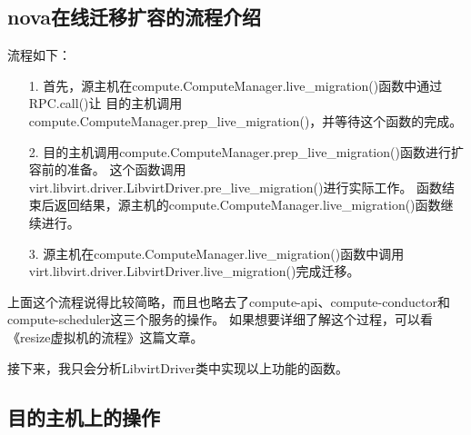 \documentclass[a4paper,left=1.5cm,right=1.5cm,11pt]{article}
\begin{document}
\subsection{nova在线迁移扩容的流程介绍}
	流程如下：
	\begin{itemize}
		\item[1.] 首先，源主机在compute.ComputeManager.live\_migration()函数中通过RPC.call()让
				  目的主机调用compute.ComputeManager.prep\_live\_migration()，并等待这个函数的完成。
		\item[2.] 目的主机调用compute.ComputeManager.prep\_live\_migration()函数进行扩容前的准备。
			      这个函数调用virt.libvirt.driver.LibvirtDriver.pre\_live\_migration()进行实际工作。
				  函数结束后返回结果，源主机的compute.ComputeManager.live\_migration()函数继续进行。
		\item[3.] 源主机在compute.ComputeManager.live\_migration()函数中调用virt.libvirt.driver.LibvirtDriver.live\_migration()完成迁移。
	\end{itemize}

	上面这个流程说得比较简略，而且也略去了compute-api、compute-conductor和compute-scheduler这三个服务的操作。
	如果想要详细了解这个过程，可以看《resize虚拟机的流程》这篇文章。\par

	接下来，我只会分析LibvirtDriver类中实现以上功能的函数。

\subsection{目的主机上的操作}
\end{document}
